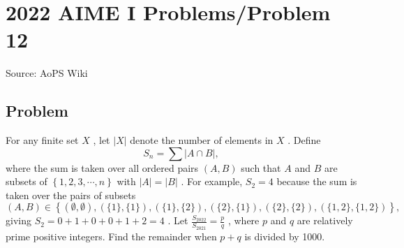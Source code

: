\documentclass[12pt]{article}
\begin{document}
\section*{{2022 AIME I Problems/Problem 12}}
Source: AoPS Wiki

\subsection*{Problem}
For any finite set $X$ , let $| X |$ denote the number of elements in $X$ . Define \[S_n = \sum | A \cap B | ,\] where the sum is taken over all ordered pairs $(A, B)$ such that $A$ and $B$ are subsets of $\left\{ 1 , 2 , 3, \cdots , n \right\}$ with $|A| = |B|$ .
For example, $S_2 = 4$ because the sum is taken over the pairs of subsets \[(A, B) \in \left\{ (\emptyset, \emptyset) , ( \{1\} , \{1\} ), ( \{1\} , \{2\} ) , ( \{2\} , \{1\} ) , ( \{2\} , \{2\} ) , ( \{1 , 2\} , \{1 , 2\} ) \right\} ,\] giving $S_2 = 0 + 1 + 0 + 0 + 1 + 2 = 4$ .
Let $\frac{S_{2022}}{S_{2021}} = \frac{p}{q}$ , where $p$ and $q$ are relatively prime positive integers. Find the remainder when $p + q$ is divided by
1000.
\end{document}
